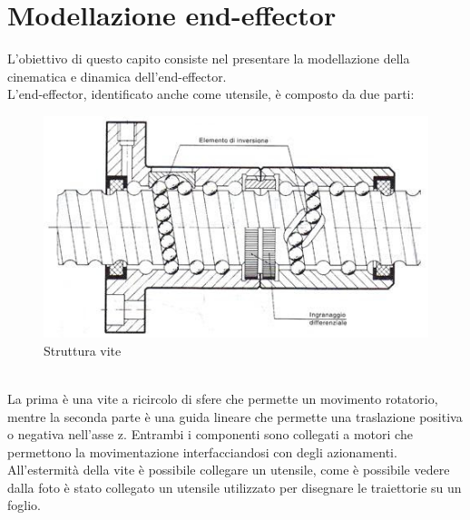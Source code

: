 \section{Modellazione end-effector}
L'obiettivo di questo capito consiste nel presentare la modellazione della cinematica e dinamica dell'end-effector.
\\L'end-effector, identificato anche come utensile, è composto da due parti: 
\begin{figure}[ht]
	\begin{center}
		\includegraphics[scale=0.5]{Immagini/ViteRicircolo}
		\caption{Struttura vite}
	\end{center}
\end{figure}
\\La prima è una vite a ricircolo di sfere che permette un movimento rotatorio, mentre la seconda parte è una guida lineare che permette una traslazione positiva o negativa nell'asse z. Entrambi i componenti sono collegati a motori che permettono la movimentazione interfacciandosi con degli azionamenti. All'estermità della vite è possibile collegare un utensile, come è possibile vedere dalla foto è stato collegato un utensile utilizzato per disegnare le traiettorie su un foglio.
